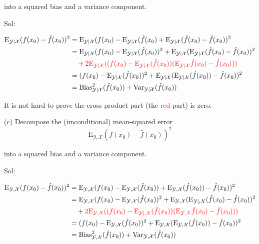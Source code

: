 \documentclass[english]{article}\usepackage[]{graphicx}\usepackage[]{color}
\begin{document}
into a squared bias and a variance component.

\vspace{0.5cm}

Sol:

\begin{align*}
\mathrm{E}_{\mathcal{Y}|\mathcal{X}}(f(x_{0})-\hat{f}(x_{0}))^{2} & =\mathrm{E}_{\mathcal{Y}|\mathcal{X}}(f(x_{0})-\mathrm{E}_{\mathcal{Y}|\mathcal{X}}(\hat{f}(x_{0})+\mathrm{E}_{\mathcal{Y}|\mathcal{X}}(\hat{f}(x_{0})-\hat{f}(x_{0}))^{2}\\
 & =\mathrm{E}_{\mathcal{Y}|\mathcal{X}}(f(x_{0})-\mathrm{E}_{\mathcal{Y}|\mathcal{X}}(\hat{f}(x_{0}))^{2}+\mathrm{E}_{\mathcal{Y}|\mathcal{X}}(\mathrm{E}_{\mathcal{Y}|\mathcal{X}}(\hat{f}(x_{0})-\hat{f}(x_{0}))^{2}\\
 & \ \ \ +{\color{red}2\mathrm{E}_{\mathcal{Y}|\mathcal{X}}((f(x_{0})-\mathrm{E}_{\mathcal{Y}|\mathcal{X}}(\hat{f}(x_{0}))(\mathrm{E}_{\mathcal{Y}|\mathcal{X}}\hat{f}(x_{0})-\hat{f}(x_{0})))}\\
 & =(f(x_{0})-\mathrm{E}_{\mathcal{Y}|\mathcal{X}}(\hat{f}(x_{0}))^{2}+\mathrm{E}_{\mathcal{Y}|\mathcal{X}}(\mathrm{E}_{\mathcal{Y}|\mathcal{X}}(\hat{f}(x_{0}))-\hat{f}(x_{0}))^{2}\\
 & =\mathrm{Bias}_{\mathcal{Y}|\mathcal{X}}^{2}(\hat{f}(x_{0}))+\mathrm{Var}_{\mathcal{Y}|\mathcal{X}}(\hat{f}(x_{0}))
\end{align*}

It is not hard to prove the cross product part (the \textcolor{red}{red}
part) is zero.

\vspace{0.5cm}

(c) Decompose the (unconditional) mean-squared error 
\[
\mathrm{E}_{\mathcal{Y},\mathcal{X}}(f(x_{0})-\hat{f}(x_{0}))^{2}
\]

into a squared bias and a variance component.

\vspace{0.5cm}

Sol:

\begin{align*}
\mathrm{E}_{\mathcal{Y},\mathcal{X}}(f(x_{0})-\hat{f}(x_{0}))^{2} & =\mathrm{E}_{\mathcal{Y},\mathcal{X}}(f(x_{0})-\mathrm{E}_{\mathcal{Y},\mathcal{X}}(\hat{f}(x_{0}))+\mathrm{E}_{\mathcal{Y},\mathcal{X}}(\hat{f}(x_{0}))-\hat{f}(x_{0}))^{2}\\
 & =\mathrm{E}_{\mathcal{Y},\mathcal{X}}(f(x_{0})-\mathrm{E}_{\mathcal{Y},\mathcal{X}}(\hat{f}(x_{0}))^{2}+\mathrm{E}_{\mathcal{Y},\mathcal{X}}(\mathrm{E}_{\mathcal{Y}|,X}(\hat{f}(x_{0})-\hat{f}(x_{0}))^{2}\\
 & \ \ \ +{\color{red}2\mathrm{E}_{\mathcal{Y},\mathcal{X}}((f(x_{0})-\mathrm{E}_{\mathcal{Y}|,X}(\hat{f}(x_{0}))(\mathrm{E}_{\mathcal{Y},X}\hat{f}(x_{0})-\hat{f}(x_{0})))}\\
 & =(f(x_{0})-\mathrm{E}_{\mathcal{Y},\mathcal{X}}(\hat{f}(x_{0}))^{2}+\mathrm{E}_{\mathcal{Y},\mathcal{X}}(\mathrm{E}_{\mathcal{Y},\mathcal{X}}(\hat{f}(x_{0}))-\hat{f}(x_{0}))^{2}\\
 & =\mathrm{Bias}_{\mathcal{Y},\mathcal{X}}^{2}(\hat{f}(x_{0}))+\mathrm{Var}_{\mathcal{Y},\mathcal{X}}(\hat{f}(x_{0}))
\end{align*}
\end{document}
